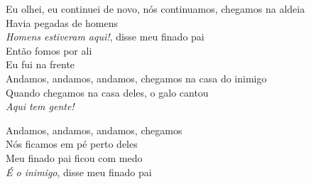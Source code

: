 \begin{linenumbers}\begingroup\raggedright
 
\noindent   Eu olhei, eu continuei de novo, nós continuamos, chegamos na aldeia\\
  Havia pegadas de homens\\
  \textit{Homens estiveram aqui!}, disse meu finado pai\\
  Então fomos por ali\\
  Eu fui na frente\\
  Andamos, andamos, andamos, chegamos na casa do inimigo\\
  Quando chegamos na casa deles, o galo cantou\\
  \textit{Aqui tem gente!}
 
\end{linenumbers}\endgroup

\bigskip

\begin{linenumbers}\begingroup\raggedright
 
\noindent   Andamos, andamos, andamos, chegamos\\
  Nós ficamos em pé perto deles\\
  Meu finado pai ficou com medo\\
  \textit{É o inimigo}, disse meu finado pai
 
\end{linenumbers}\endgroup

\bigskip

